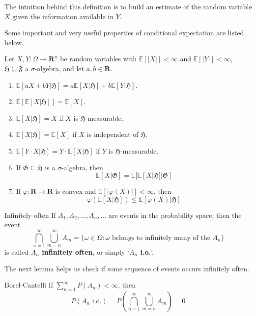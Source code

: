 The intuition behind this definition is to build an estimate of the random variable $X$ given the information available in $Y$.

Some important and very useful properties of conditional expectation are listed below.

\begin{theorem}[]{}{}
	Let $X, Y : \Omega \longrightarrow \textbf{R}^n$ be random variables with $\mathbb{E}[|X|] < \infty$ and $\mathbb{E}[|Y|] < \infty$, $\mathfrak{H} \subseteq \mathfrak{F}$ a $\sigma$-algebra, and let $a, b \in \textbf{R}$.
	\begin{enumerate}
		\item $\mathbb{E} [ a X + b Y | \mathfrak{H}] = a \mathbb{E} [X | \mathfrak{H}] + b \mathbb{E} [Y | \mathfrak{H}]$.
		\item $\mathbb{E} [ \mathbb{E} [X | \mathfrak{H}] ] = \mathbb{E} [X]$.
		\item $\mathbb{E} [X | \mathfrak{H}] = X$ if $X$ is $\mathfrak{H}$-measurable.
		\item $\mathbb{E} [X | \mathfrak{H}] = \mathbb{E} [X]$ if $X$ is independent of $\mathfrak{H}$.
		\item $\mathbb{E} [Y \cdot X | \mathfrak{H}] = Y \cdot \mathbb{E} [X | \mathfrak{H}]$ if $Y$ is $\mathfrak{H}$-measurable.
		\item If $\mathfrak{G} \subseteq \mathfrak{H}$ is a $\sigma$-algebra, then \[ \mathbb{E} [X | \mathfrak{G}] = \mathbb{E} [ \mathbb{E} [X | \mathfrak{H}] | \mathfrak{G}] \]
		\item If $\varphi : \textbf{R} \longrightarrow \textbf{R}$ is convex and $\mathbb{E} [ | \varphi (X) | ] < \infty$, then \[ \varphi (\mathbb{E} [X | \mathfrak{H}]) \leq \mathbb{E} [\varphi(X) | \mathfrak{H}] \]
	\end{enumerate}
\end{theorem}

\begin{definition}[]{Infinitely often}{}
If $A_1, A_2, \ldots, A_n, \ldots$ are events in the probability space, then the event
\[
	\bigcap_{n=1}^\infty \bigcup_{m=n}^\infty A_m = \{ \omega \in \Omega : \omega \text{ belongs to infinitely many of the } A_n \}
\]
is called \textbf{$A_n$ infinitely often}, or simply `\textbf{$A_n$ i.o.}'.
\end{definition}

The next lemma helps us check if some sequence of events occurs infinitely often.

\begin{lemma}[]{Borel-Cantelli}{}
	If $\sum_{n=1}^\infty P(A_n) < \infty$, then
	\[
		P(A_n \text{ i.o.}) = P \left( \bigcap_{n=1}^\infty \bigcup_{m=n}^\infty A_m \right) = 0
	\]
\end{lemma}

